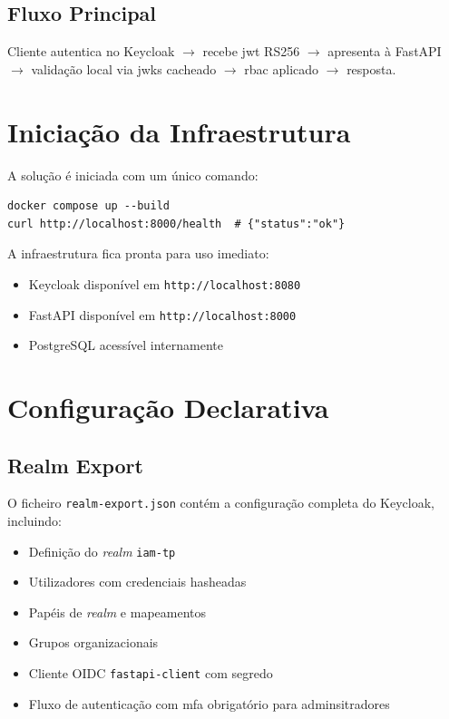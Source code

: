 \subsection{Fluxo Principal}

Cliente autentica no Keycloak $\rightarrow$ recebe \gls{jwt} RS256 $\rightarrow$ apresenta à FastAPI $\rightarrow$ validação local via \gls{jwks} cacheado $\rightarrow$ \gls{rbac} aplicado $\rightarrow$ resposta.

\section{Iniciação da Infraestrutura}

A solução é iniciada com um único comando:

\begin{lstlisting}[caption={Arranque completo da infraestrutura},label={lst:docker}]
docker compose up --build
curl http://localhost:8000/health  # {"status":"ok"}
\end{lstlisting}

A infraestrutura fica pronta para uso imediato:
\begin{itemize}
  \item Keycloak disponível em \texttt{http://localhost:8080}
  \item FastAPI disponível em \texttt{http://localhost:8000}
  \item PostgreSQL acessível internamente
\end{itemize}

\section{Configuração Declarativa}

\subsection{Realm Export}

O ficheiro \texttt{realm-export.json} contém a configuração completa do Keycloak, incluindo:
\begin{itemize}
  \item Definição do \textit{realm} \texttt{iam-tp}
  \item Utilizadores com credenciais hasheadas
  \item Papéis de \textit{realm} e mapeamentos
  \item Grupos organizacionais
  \item Cliente OIDC \texttt{fastapi-client} com segredo
  \item Fluxo de autenticação com \gls{mfa} obrigatório para adminsitradores
\end{itemize}

